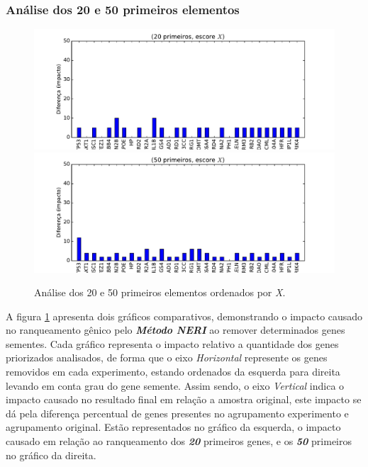 \subsubsection{Análise dos 20 e 50 primeiros elementos}
%
\begin{figure}[ht!]
\includegraphics[width=1\textwidth]{Images/analyses/fig_LOO_X_20.pdf}
\includegraphics[width=1\textwidth]{Images/analyses/fig_LOO_X_50.pdf}
\caption {Análise dos 20 e 50 primeiros elementos ordenados por \textit{X}.
\label{fig_LOO_X_20-50}}
\end{figure}
%

%
A figura \ref{fig_LOO_X_20-50} apresenta dois gráficos comparativos, demonstrando o impacto causado no ranqueamento gênico pelo \textsl{\textbf{Método NERI}} ao remover determinados genes sementes. Cada gráfico representa o impacto relativo a quantidade dos genes priorizados analisados, de forma que o eixo \textsl{Horizontal} represente os genes removidos em cada experimento, estando ordenados da esquerda para direita levando em conta grau do gene semente. Assim sendo, o eixo \textsl{Vertical} indica o impacto causado no resultado final em relação a amostra original, este impacto se dá pela diferença percentual de genes presentes no agrupamento experimento e agrupamento original. Estão representados no gráfico da esquerda, o impacto causado em relação ao ranqueamento dos \textsl{\textbf{20}} primeiros genes, e os \textsl{\textbf{50}} primeiros no gráfico da direita.

